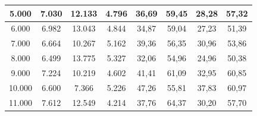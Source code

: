 \begin{table}[ht!]
\begin{tabular}{|c|c|c|c|c|c|c|c|}
5.000               & 7.030       & 12.133      & 4.796       & 36,69                                                             & 59,45                                                          & 28,28                                                               & 57,32                                                             \\ \hline
6.000               & 6.982       & 13.043      & 4.844       & 34,87                                                             & 59,04                                                          & 27,23                                                               & 51,39                                                             \\ \hline
7.000               & 6.664       & 10.267      & 5.162       & 39,36                                                             & 56,35                                                          & 30,96                                                               & 53,86                                                             \\ \hline
8.000               & 6.499       & 13.775      & 5.327       & 32,06                                                             & 54,96                                                          & 24,96                                                               & 50,38                                                             \\ \hline
9.000               & 7.224       & 10.219      & 4.602       & 41,41                                                             & 61,09                                                          & 32,95                                                               & 60,85                                                             \\ \hline
10.000              & 6.600       & 7.366       & 5.226       & 47,26                                                             & 55,81                                                          & 37,83                                                               & 60,97                                                             \\ \hline
11.000              & 7.612       & 12.549      & 4.214       & 37,76                                                             & 64,37                                                          & 30,20                                                               & 57,70                                                             \\ \hline

\end{tabular}
\end{table}

